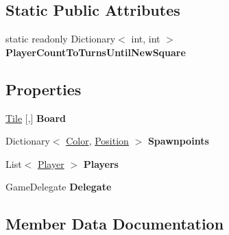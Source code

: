 \subsection*{Static Public Attributes}
\begin{DoxyCompactItemize}
\item 
static readonly Dictionary$<$ int, int $>$ {\bfseries Player\+Count\+To\+Turns\+Until\+New\+Square}
\end{DoxyCompactItemize}
\subsection*{Properties}
\begin{DoxyCompactItemize}
\item 
\mbox{\label{class_pushy_squares_1_1_game_a55a7b2aea5fbd4019c8268cd5e75e248}} 
\hyperlink{namespace_pushy_squares_a99b558ed55fb7c5c20e9fe37c652132c}{Tile} \mbox{[},\mbox{]} {\bfseries Board}
\item 
\mbox{\label{class_pushy_squares_1_1_game_ad4239be1bdeff9af01984aaa9dc0971a}} 
Dictionary$<$ \hyperlink{namespace_pushy_squares_a456c990da0c8e2089c171d31f7e27574}{Color}, \hyperlink{struct_pushy_squares_1_1_position}{Position} $>$ {\bfseries Spawnpoints}
\item 
\mbox{\label{class_pushy_squares_1_1_game_a3b10c0eba93e4c8f94f73b714871d4a9}} 
List$<$ \hyperlink{class_pushy_squares_1_1_player}{Player} $>$ {\bfseries Players}
\item 
\mbox{\label{class_pushy_squares_1_1_game_adbcfed9c1759c9c2f0cac46c271e34ff}} 
Game\+Delegate {\bfseries Delegate}
\end{DoxyCompactItemize}


\subsection{Member Data Documentation}
\mbox{\label{class_pushy_squares_1_1_game_a25a1a1f363ec78de76deaa344f700011}} 
